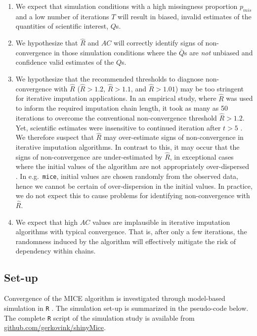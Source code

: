 \documentclass[Royal,times,sageh]{sagej}
\begin{document}
\begin{enumerate}
\def\labelenumi{\arabic{enumi}.}
\item
  We expect that simulation conditions with a high missingness
  proportion \(p_{mis}\) and a low number of iterations \(T\) will
  result in biased, invalid estimates of the quantities of scientific
  interest, \(Q\)s.
\item
  We hypothesize that \(\widehat{R}\) and \(AC\) will correctly identify
  signs of non-convergence in those simulation conditions where the
  \(\bar{Q}\)s are \emph{not} unbiased and confidence valid estimates of
  the \(Q\)s.
\item
  We hypothesize that the recommended thresholds to diagnose
  non-convergence with \(\widehat{R}\) (\(\widehat{R} > 1.2\),
  \(\widehat{R} > 1.1\), and \(\widehat{R} > 1.01\)) may be too
  stringent for iterative imputation applications. In an empirical
  study, where \(\widehat{R}\) was used to inform the required
  imputation chain length, it took as many as 50 iterations to overcome
  the conventional non-convergence threshold \(\widehat{R}>1.2\). Yet,
  scientific estimates were insensitive to continued iteration after
  \(t>5\) \citep{lace07}. We therefore suspect that \(\widehat{R}\) may
  over-estimate signs of non-convergence in iterative imputation
  algorithms. In contrast to this, it may occur that the signs of
  non-convergence are under-estimated by \(\widehat{R}\), in exceptional
  cases where the initial values of the algorithm are not appropriately
  over-dispersed \citep[p.~437]{broo98}. In e.g.~\texttt{mice}, initial
  values are chosen randomly from the observed data, hence we cannot be
  certain of over-dispersion in the initial values. In practice, we do
  not expect this to cause problems for identifying non-convergence with
  \(\widehat{R}\).
\item
  We expect that high \(AC\) values are implausible in iterative
  imputation algorithms with typical convergence. That is, after only a
  few iterations, the randomness induced by the algorithm will
  effectively mitigate the risk of dependency within chains.
\end{enumerate}

\hypertarget{set-up}{%
\subsection{Set-up}\label{set-up}}

Convergence of the MICE algorithm is investigated through model-based
simulation in \texttt{R} \citep[version 3.6.3;][]{R}. The simulation
set-up is summarized in the pseudo-code below. The complete \texttt{R}
script of the simulation study is available from
\href{https://github.com/gerkovink/shinyMice/tree/master/3.Thesis/1.SimulationStudy}{github.com/gerkovink/shinyMice}.
\end{document}
